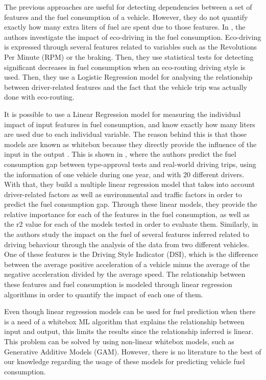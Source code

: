 The previous approaches are useful for detecting dependencies between a set of features and the fuel consumption of a vehicle. However, they do not quantify exactly how many extra liters of fuel are spent due to those features. In \parencite{andrieu2014evaluation}, the authors investigate the impact of eco-driving in the fuel consumption. Eco-driving is expressed through several features related to variables such as the Revolutions Per Minute (RPM) or the braking. Then, they use statistical tests for detecting significant decreases in fuel consumption when an eco-routing driving style is used. Then, they use a Logistic Regression model for analysing the relationship between driver-related features and the fact that the vehicle trip was actually done with eco-routing.

It is possible to use a Linear Regression model for measuring the individual impact of input features in fuel consumption, and know exactly how many liters are used due to each individual variable. The reason behind this is that those models are known as whitebox because they directly provide the influence of the input in the output \parencite{arrieta2020explainable}.
This is shown in \parencite{pavlovic2020understanding}, where the authors predict the fuel consumption gap between type-approval tests and real-world driving trips, using the information of one vehicle during one year, and with 20 different drivers. With that, they build a multiple linear regression model that takes into account driver-related factors as well as environmental and traffic factors in order to predict the fuel consumption gap. Through these linear models, they provide the relative importance for each of the features in the fuel consumption, as well as the r2 value for each of the models tested in order to evaluate them. Similarly, in  \parencite{lasocki2019environmental} the authors study the impact on the fuel of several features inferred related to driving behaviour through the analysis of the data from two different vehicles. One of these features is the Driving Style Indicator (DSI), which is the difference between the average positive acceleration of a vehicle minus the average of the negative acceleration divided by the average speed. The relationship between these features and fuel consumption is modeled through linear regression algorithms in order to quantify the impact of each one of them.

Even though linear regression models can be used for fuel prediction when there is a need of a whitebox ML algorithm that explains the relationship between input and output, this limits the results since the relationship inferred is linear. This problem can be solved by using non-linear whitebox models, such as Generative Additive Models (GAM). However, there is no literature to the best of our knowledge regarding the usage of these models for predicting vehicle fuel consumption.

